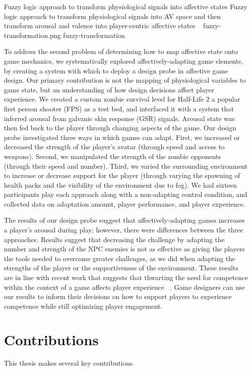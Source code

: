 \largeimg
{Fuzzy logic approach to transform physiological signals into affective states}
{Fuzzy logic approach to transform physiological signals into AV space and then transform arousal and valence into player-centric affective states ~\cite{mandryk2007fuzzy}}
{fuzzy-transformation.png}
{fuzzy-transformation}

To address the second problem of determining how to map affective state onto game mechanics, we systematically explored affectively-adapting game elements, by creating a system with which to deploy a design probe in affective game design. Our primary contribution is not the mapping of physiological variables to game state, but an understanding of how design decisions affect player experience. We created a custom zombie survival level for Half-Life 2 a popular first person shooter (FPS) as a test bed, and interfaced it with a system that inferred arousal from galvanic skin response (GSR) signals. Arousal state was then fed back to the player through changing aspects of the game. Our design probe investigated three ways in which games can adapt. First, we increased or decreased the strength of the player's avatar (through speed and access to weapons). Second, we manipulated the strength of the zombie opponents (through their speed and number). Third, we varied the surrounding environment to increase or decrease support for the player (through varying the spawning of health packs and the visibility of the environment due to fog). We had sixteen participants play each approach along with a non-adapting control condition, and collected data on adaptation amount, player performance, and player experience.

The results of our design probe suggest that affectively-adapting games increases a player's arousal during play; however, there were differences between the three approaches. Results suggest that decreasing the challenge by adapting the number and strength of the NPC enemies is not as effective as giving the players the tools needed to overcome greater challenges, as we did when adapting the strengths of the player or the supportiveness of the environment. These results are in line with recent work that suggests that thwarting the need for competence within the context of a game affects player experience ~\cite{przybylski2013competence}. Game designers can use our results to inform their decisions on how to support players to experience competence while still optimizing player engagement.

\section{Contributions}
This thesis makes several key contributions.

